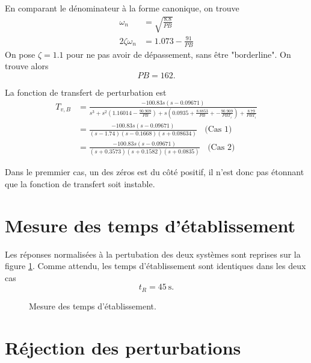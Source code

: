 \documentclass[frenchb, paper=a4, fontsize=11pt]{scrartcl}
\numberwithin{equation}{section}					%
\numberwithin{figure}{section}					%
\numberwithin{table}{section}						%
\begin{document}
En comparant le dénominateur à la forme canonique, on trouve
\begin{align*}
\omega_n &= \sqrt{\frac{8.8}{PB}}\\
2\zeta \omega_n &= 1.073-\frac{91}{PB} 
\end{align*}
On pose $\zeta=1.1$ pour ne pas avoir de dépassement, sans être "borderline". On trouve alors 
\begin{equation}
PB=162.
\end{equation}

La fonction de transfert de perturbation est 
\begin{align*}
T_{v,B} &= \frac{-100.83 s (s-0.09671)}{s^3 + s^2 (1.16014-\frac{90.909}{PB})+ s(0.0935 + \frac{8.8853}{PB} + - \frac{90.909}{PBT_i}) + \frac{8.79}{PBT_i}} \\
&=  \frac{-100.83 s (s-0.09671)}{(s-1.74)(s-0.1668)(s+0.08634)} \ \ \ \ \text{(Cas 1)}\\
&=  \frac{-100.83 s (s-0.09671)}{(s+0.3573)(s+0.1582)(s+0.0835)} \ \ \ \  \text{(Cas 2)}
\end{align*}

Dans le premmier cas, un des zéros est du côté positif, il n'est donc pas étonnant que la fonction de transfert soit instable.




\section{Mesure des temps d'établissement}
Les réponses normalisées à la pertubation des deux systèmes sont
reprises sur la figure \ref{fig:settling-time}. Comme attendu,
les temps d'établissement sont identiques dans les deux cas
\begin{equation}
	t_R = \SI{45}{\second}.
\end{equation}

\begin{figure}[ht]
	\centering
	
	\caption{Mesure des temps d'établissement.}
	\label{fig:settling-time}
\end{figure}

\section{Réjection des perturbations}
\end{document}
